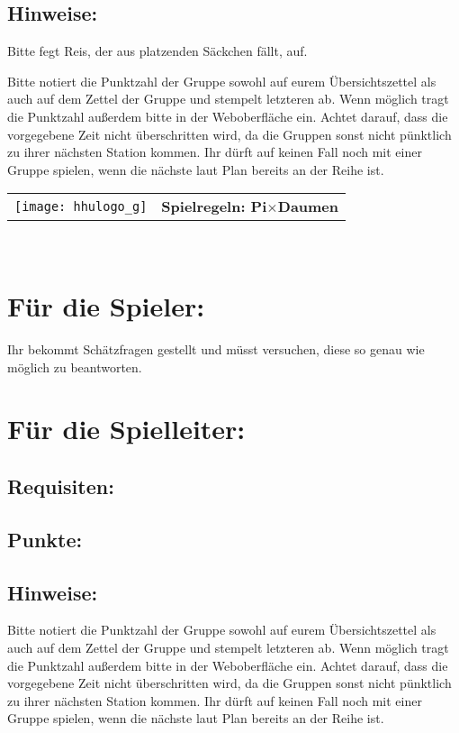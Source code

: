 \documentclass[a4paper,10pt]{article}
\def\spieli{Pi$\times $Daumen}
\newcommand{\unten}{
 Bitte notiert die Punktzahl der Gruppe sowohl auf eurem Übersichtszettel als auch auf dem Zettel der Gruppe und stempelt letzteren ab. Wenn möglich tragt die Punktzahl außerdem bitte in der Weboberfläche ein.
 Achtet darauf, dass die vorgegebene Zeit nicht überschritten wird, da die Gruppen sonst nicht pünktlich zu ihrer nächsten Station kommen. Ihr dürft auf keinen Fall noch mit einer Gruppe spielen, wenn die nächste laut Plan bereits an der Reihe ist.
}
\begin{document}
\subsection*{Hinweise:}
Bitte fegt Reis, der aus platzenden Säckchen fällt, auf.
\unten

\newpage

  \begin{tabularx}{\textwidth}{lc}
    \texttt{[image: hhulogo\_g]}
  & {\Huge \textbf{Spielregeln: \spieli}}
  \end{tabularx}\\


\Large
\section*{Für die Spieler:}
Ihr bekommt Schätzfragen gestellt und müsst versuchen, diese so genau wie möglich
zu beantworten. 

\section*{Für die Spielleiter:}
\subsection*{Requisiten:} 
\subsection*{Punkte:}
\subsection*{Hinweise:}
\unten

\newpage
\end{document}
